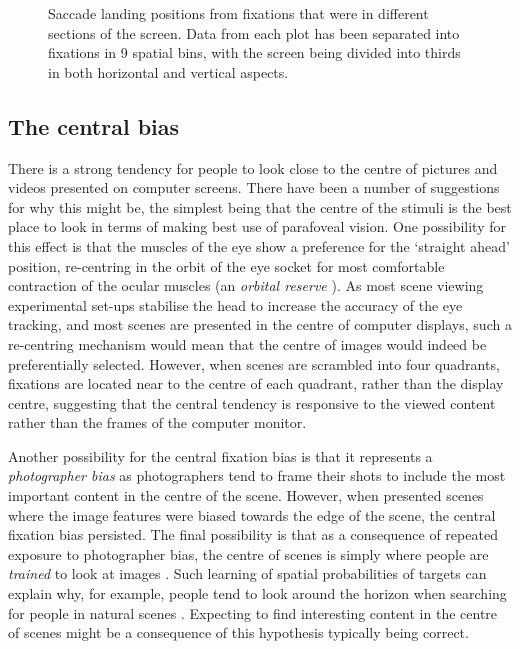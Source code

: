\begin{figure}[htb]
\caption{Saccade landing positions from fixations that were in different sections of the screen. Data from each plot has been separated into fixations in 9 spatial bins, with the screen being divided into thirds in both horizontal and vertical aspects.}
\label{fig:empiricalSaccadicFlow}
\end{figure}

\subsection{The central bias}
 
There is a strong tendency for people to look close to the centre of pictures \citep{tatler2007, tatler2005, canosa2003, clarke-tatler2014} and videos \citep{tseng2009,loschky2015} presented on computer screens. There have been a number of suggestions for why this might be, the simplest being that the centre of the stimuli is the best place to look in terms of making best use of parafoveal vision. One possibility for this effect is that the muscles of the eye show a preference for the `straight ahead' position, re-centring in the orbit of the eye socket for most comfortable contraction of the ocular muscles (an \emph{orbital reserve} \citep{fuller1996}). As most scene viewing experimental set-ups stabilise the head to increase the accuracy of the eye tracking, and most scenes are presented in the centre of computer displays, such a re-centring mechanism would mean that the centre of images would indeed be preferentially selected. However, when scenes are scrambled into four quadrants, fixations are located near to the centre of each quadrant, rather than the display centre, suggesting that the central tendency is responsive to the viewed content \citep{stainer2013} rather than the frames of the computer monitor.

Another possibility for the central fixation bias is that it represents a \emph{photographer bias} as photographers tend to frame their shots to include the most important content in the centre of the scene. However, when \cite{tatler2007} presented scenes where the image features were biased towards the edge of the scene, the central fixation bias persisted. The final possibility is that as a consequence of repeated exposure to photographer bias, the centre of scenes is simply where people are \emph{trained} to look at images \citep{parkhurst2002}. Such learning of spatial probabilities of targets can explain why, for example, people tend to look around the horizon when searching for people in natural scenes \citep{birmingham2009, torralba2006, ehinger2009}. Expecting to find interesting content in the centre of scenes might be a consequence of this hypothesis typically being correct. 


